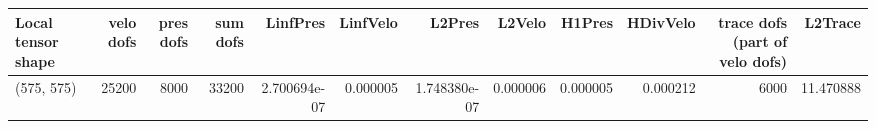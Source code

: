 \begin{tabular}{lrrrrrrrrrrr}
\toprule
Local tensor shape &  velo dofs &  pres dofs &  sum dofs &     LinfPres &  LinfVelo &       L2Pres &   L2Velo &   H1Pres &  HDivVelo &  trace dofs (part of velo dofs) &   L2Trace \\
\midrule
        (575, 575) &      25200 &       8000 &     33200 & 2.700694e-07 &  0.000005 & 1.748380e-07 & 0.000006 & 0.000005 &  0.000212 &                            6000 & 11.470888 \\
\bottomrule
\end{tabular}
